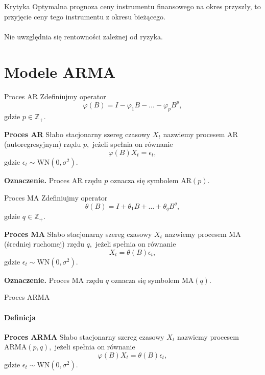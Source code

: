 \documentclass[a4paper, 11pt]{beamer}
\begin{document}
	\begin{frame}{Krytyka}
		Optymalna prognoza ceny instrumentu finansowego na okres przyszły, to przyjęcie ceny tego instrumentu z okresu bieżącego.
		\\~\\
		Nie uwzględnia się rentowności zależnej od ryzyka.
	\end{frame}
	
	\section{Modele ARMA}

	\begin{frame}{Proces AR}
		Zdefiniujmy operator \[
			\varphi\left(B\right) = I - \varphi_{1} B - \ldots - \varphi_{p} B^{p},
		\] gdzie $p \in \mathbb{Z}_{+}.$
		\begin{block}{\textbf{Proces AR}}
			Słabo stacjonarny szereg czasowy $X_t$ nazwiemy procesem AR (autoregresyjnym) rzędu $p,$ jeżeli spełnia on równanie \[
				\varphi\left(B\right) X_t = \epsilon_{t},
			\] gdzie $\epsilon_{t} \sim \mbox{WN}\left(0, \sigma^2\right).$
		\end{block}
		\begin{alert}{\textbf{Oznaczenie.}}
			Proces AR rzędu $p$ oznacza się symbolem $\mbox{AR}\left(p\right).$
		\end{alert}
	\end{frame}

	\begin{frame}{Proces MA}
		Zdefiniujmy operator \[
			\theta\left(B\right) = I + \theta_{1} B + \ldots +\theta_{q} B^{q},
		\] gdzie $q \in \mathbb{Z}_{+}.$
		\begin{block}{\textbf{Proces MA}}
			Słabo stacjonarny szereg czasowy $X_t$ nazwiemy procesem MA (średniej ruchomej) rzędu $q,$ jeżeli spełnia on równanie \[
				X_t = \theta\left(B\right) \epsilon_{t},
			\] gdzie $\epsilon_{t} \sim \mbox{WN}\left(0, \sigma^2\right).$
		\end{block}
		\begin{alert}{\textbf{Oznaczenie.}}
			Proces MA rzędu $q$ oznacza się symbolem $\mbox{MA}\left(q\right).$
		\end{alert}
	\end{frame}
	
	\begin{frame}{Proces ARMA}
		\framesubtitle{Definicja}
		\begin{block}{\textbf{Proces ARMA}}
			Słabo stacjonarny szereg czasowy $X_t$ nazwiemy procesem $\mbox{ARMA}\left(p, q\right),$ jeżeli spełnia on równanie \[
				\varphi\left(B\right) X_t = \theta\left(B\right) \epsilon_{t},
			\] gdzie $\epsilon_{t} \sim \mbox{WN}\left(0, \sigma^2\right).$
		\end{block}
	\end{frame}
	
\end{document}
